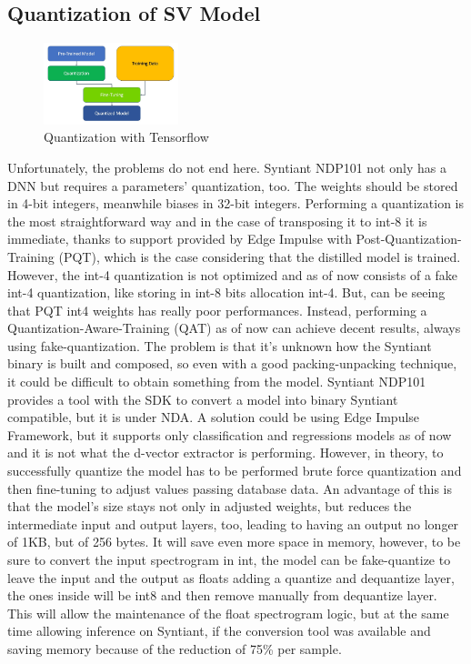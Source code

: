 \subsection{Quantization of SV Model}
\label{sec:quantization}
\begin{figure}
  \begin{center}
    \includegraphics[width=0.35\textwidth]{images/3.04 Quantization Flow.jpg}
  \end{center}
  \caption{Quantization with Tensorflow}
\end{figure}
Unfortunately, the problems do not end here. Syntiant NDP101 not only has a DNN but requires a parameters' quantization, too. The weights should be stored in 4-bit\cite{description_ndp101} integers, meanwhile biases in 32-bit integers. Performing a quantization is the most straightforward way and in the case of transposing it to int-8 it is immediate, thanks to support provided by Edge Impulse with Post-Quantization-Training (PQT)\cite{pqt_tensorflow}, which is the case considering that the distilled model is trained. However, the int-4 quantization is not optimized and as of now consists of a fake int-4 quantization, like storing in int-8 bits allocation int-4.\cite{wu2023understandingint4quantizationtransformer} But, can be seeing that PQT int4 weights has really poor performances. Instead, performing a Quantization-Aware-Training (QAT)\cite{qat_tensorflow} as of now can achieve decent results, always using fake-quantization. The problem is that it's unknown how the Syntiant binary is built and composed, so even with a good packing-unpacking technique, it could be difficult to obtain something from the model. Syntiant NDP101 provides a tool with the SDK to convert a model into binary Syntiant compatible, but it is under NDA. A solution could be using Edge Impulse Framework, but it supports only classification and regressions models as of now and it is not what the d-vector extractor is performing.\newline
However, in theory, to successfully quantize the model has to be performed brute force quantization and then fine-tuning to adjust values passing database data. An advantage of this is that the model's size stays not only in adjusted weights, but reduces the intermediate input and output layers, too, leading to having an output no longer of 1KB, but of 256 bytes. It will save even more space in memory, however, to be sure to convert the input spectrogram in int, the model can be fake-quantize to leave the input and the output as floats adding a quantize and dequantize layer, the ones inside will be int8 and then remove manually from dequantize layer. This will allow the maintenance of the float spectrogram logic, but at the same time allowing inference on Syntiant, if the conversion tool was available and saving memory because of the reduction of 75\% per sample.
